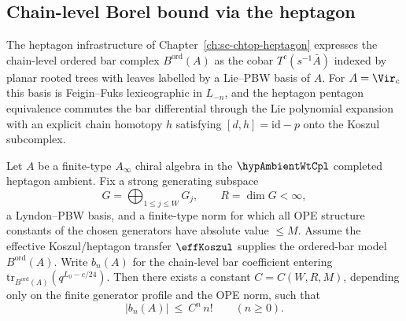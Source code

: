 \subsection{Chain-level Borel bound via the heptagon}
\label{subsec:3dg-chain-level-borel-bound}
%
%

The heptagon infrastructure of
Chapter~\ref{ch:sc-chtop-heptagon} expresses the chain-level ordered
bar complex $B^{\mathrm{ord}}(A)$ as the cobar
$T^{c}(s^{-1}\bar A)$ indexed by planar rooted trees with leaves
labelled by a Lie--PBW basis of $A$. For $A = \Vir_{c}$ this basis is
Feigin--Fuks lexicographic in $L_{-n}$, and the heptagon pentagon
equivalence commutes the bar differential through the Lie polynomial
expansion with an explicit chain homotopy $h$ satisfying
$[d, h] = \mathrm{id} - p$ onto the Koszul subcomplex.

\begin{proposition}
\label{prop:3dg-heptagon-growth-bound}
%
Let $A$ be a finite-type \(A_{\infty}\) chiral algebra in the
\(\hypAmbientWtCpl\) completed heptagon ambient. Fix a strong
generating subspace
\[
G=\bigoplus_{1\le j\le W}G_j,\qquad R=\dim G<\infty ,
\]
a Lyndon--PBW basis, and a finite-type norm for which all OPE structure
constants of the chosen generators have absolute value \(\le M\).
Assume the effective Koszul/heptagon transfer \(\effKoszul\) supplies
the ordered-bar model \(B^{\mathrm{ord}}(A)\).
Write \(b_{n}(A)\) for the chain-level bar coefficient entering
$\mathrm{tr}_{B^{\mathrm{ord}}(A)}(q^{L_{0} - c/24})$. Then there
exists a constant \(C=C(W,R,M)\), depending only on the finite
generator profile and the OPE norm, such that
\begin{equation}
\label{eq:3dg-heptagon-growth-bound}
|b_{n}(A)|\ \le\ C^{n}\, n!
\qquad (n \ge 0).
\end{equation}
\end{proposition}

